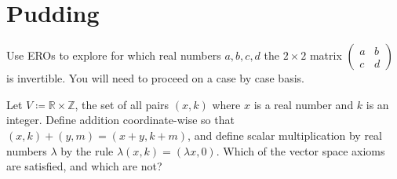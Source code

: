 \documentclass[answers]{exam}
\begin{document}
\section*{Pudding}
\begin{questions}

\question%
Use EROs to explore for which real numbers $a, b, c, d$ the $2 \times 2$ matrix $\begin{pmatrix}a & b \\ c & d\end{pmatrix}$ is invertible. You will need to proceed on a case by case basis.



\question%



\question%
Let $V\coloneqq\mathbb{R} \times \mathbb{Z}$, the set of all pairs $(x, k)$ where $x$ is a real number and $k$ is an integer. Define addition coordinate-wise so that $(x, k)+(y, m)=(x+y, k+m)$, and define scalar multiplication by real numbers $\lambda$ by the rule $\lambda(x, k)=(\lambda x, 0)$. Which of the vector space axioms are satisfied, and which are not?

\end{questions}
\end{document}
